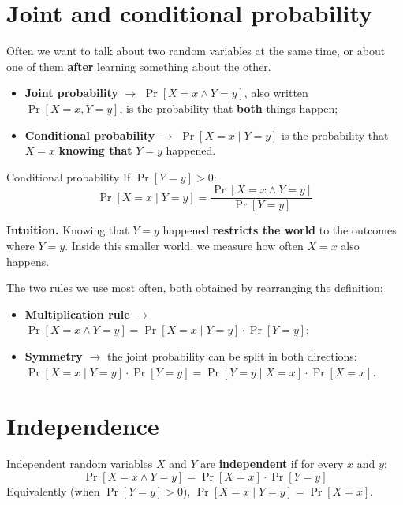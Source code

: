\section{Joint and conditional probability}

Often we want to talk about two random variables at the same time, or about one of them \textbf{after} learning something about the other.
\begin{itemize}
  \item \textbf{Joint probability} $\to$ $\Pr[X = x \wedge Y = y]$, also written $\Pr[X = x, Y = y]$, is the probability that \textbf{both} things happen;
  \item \textbf{Conditional probability} $\to$ $\Pr[X = x \mid Y = y]$ is the probability that $X = x$ \textbf{knowing that} $Y = y$ happened.
\end{itemize}

\begin{frameddefn}{Conditional probability}
  If $\Pr[Y = y] > 0$:
  \[
    \Pr[X = x \mid Y = y] = \frac{\Pr[X = x \wedge Y = y]}{\Pr[Y = y]}
  \]
\end{frameddefn}

\textbf{Intuition.} Knowing that $Y = y$ happened \textbf{restricts the world} to the outcomes where $Y = y$. Inside this smaller world, we measure how often $X = x$ also happens.

The two rules we use most often, both obtained by rearranging the definition:
\begin{itemize}
  \item \textbf{Multiplication rule} $\to$ $\Pr[X = x \wedge Y = y] = \Pr[X = x \mid Y = y] \cdot \Pr[Y = y]$;
  \item \textbf{Symmetry} $\to$ the joint probability can be split in both directions: $\Pr[X = x \mid Y = y] \cdot \Pr[Y = y] = \Pr[Y = y \mid X = x] \cdot \Pr[X = x]$.
\end{itemize}

\section{Independence}

\begin{frameddefn}{Independent random variables}
  $X$ and $Y$ are \textbf{independent} if for every $x$ and $y$:
  \[
    \Pr[X = x \wedge Y = y] = \Pr[X = x] \cdot \Pr[Y = y]
  \]
  Equivalently (when $\Pr[Y = y] > 0$), $\Pr[X = x \mid Y = y] = \Pr[X = x]$.
\end{frameddefn}

